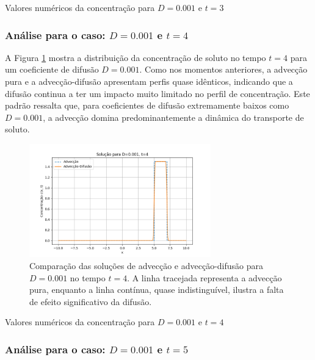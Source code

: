 \begin{table}[H]
    \centering
    \caption{Valores numéricos da concentração para \( D = 0.001 \) e \( t = 3 \)}
    
\end{table}


\subsubsection{Análise para o caso: \( D = 0.001 \) e \( t = 4 \)}

A Figura \ref{fig:advec_diffus_0.001_t4} mostra a distribuição da concentração de soluto no tempo \( t = 4 \) para um coeficiente de difusão \( D = 0.001 \). Como nos momentos anteriores, a advecção pura e a advecção-difusão apresentam perfis quase idênticos, indicando que a difusão continua a ter um impacto muito limitado no perfil de concentração. Este padrão ressalta que, para coeficientes de difusão extremamente baixos como \( D = 0.001 \), a advecção domina predominantemente a dinâmica do transporte de soluto.

\begin{figure}[H]
    \centering
    \includegraphics[width=0.7\textwidth]{code/plot/Advec_Difus_t4_D0.001.png}
    \caption{Comparação das soluções de advecção e advecção-difusão para \( D = 0.001 \) no tempo \( t = 4 \). A linha tracejada representa a advecção pura, enquanto a linha contínua, quase indistinguível, ilustra a falta de efeito significativo da difusão.}
    \label{fig:advec_diffus_0.001_t4}
\end{figure}

\begin{table}[H]
    \centering
    \caption{Valores numéricos da concentração para \( D = 0.001 \) e \( t = 4 \)}
    
\end{table}


\subsubsection{Análise para o caso: \( D = 0.001 \) e \( t = 5 \)}

